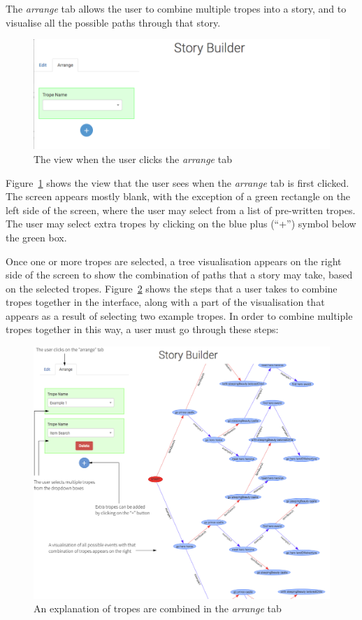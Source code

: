 \documentclass[11pt]{report}
\begin{document}
The \emph{arrange} tab allows the user to combine multiple tropes into a story,
and to visualise all the possible paths through that story.

\begin{figure}[!th]
\centerline{\includegraphics[width=\textwidth]{storybuilder6.png}}
\caption{The view when the user clicks the \emph{arrange} tab}\label{fig:sb-arrange}
\end{figure}

Figure~\ref{fig:sb-arrange} shows the view that the user sees when the
\emph{arrange} tab is first clicked. The screen appears mostly blank, with the
exception of a green rectangle on the left side of the screen, where the user
may select from a list of pre-written tropes. The user may select extra tropes
by clicking on the blue plus (``+'') symbol below the green box.

Once one or more tropes are selected, a tree visualisation appears on the right
side of the screen to show the combination of paths that a story may take, based
on the selected tropes. Figure~\ref{fig:sb-combine-ann} shows the steps that a
user takes to combine tropes together in the interface, along with a part of the
visualisation that appears as a result of selecting two example tropes. In order
to combine multiple tropes together in this way, a user must go through these steps:

\begin{figure}[!th]
\centerline{\includegraphics[width=\textwidth]{storybuilder-combine1.png}}
\caption{An explanation of tropes are combined in the \emph{arrange} tab}\label{fig:sb-combine-ann}
\end{figure}
\end{document}
